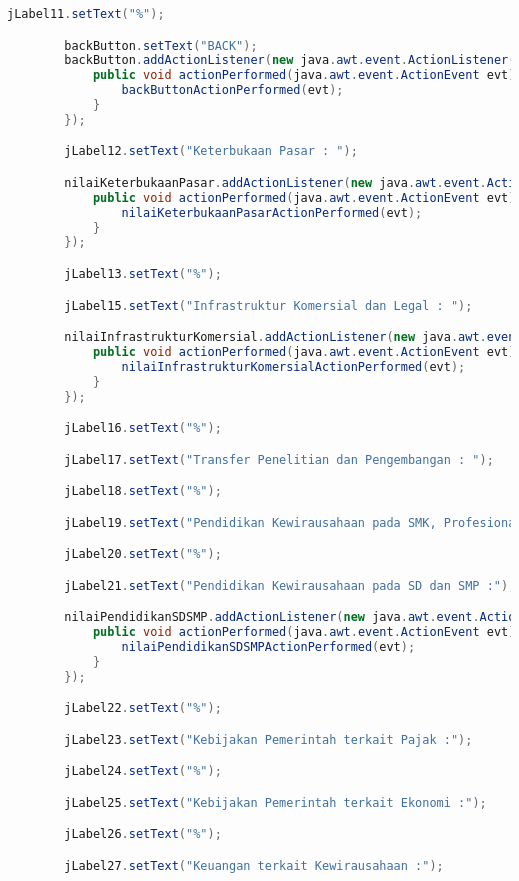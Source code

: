 \begin{lstlisting}[language=Java, caption=TampilanKondisiEksternal.java]
        jLabel11.setText("%");

        backButton.setText("BACK");
        backButton.addActionListener(new java.awt.event.ActionListener() {
            public void actionPerformed(java.awt.event.ActionEvent evt) {
                backButtonActionPerformed(evt);
            }
        });

        jLabel12.setText("Keterbukaan Pasar : ");

        nilaiKeterbukaanPasar.addActionListener(new java.awt.event.ActionListener() {
            public void actionPerformed(java.awt.event.ActionEvent evt) {
                nilaiKeterbukaanPasarActionPerformed(evt);
            }
        });

        jLabel13.setText("%");

        jLabel15.setText("Infrastruktur Komersial dan Legal : ");

        nilaiInfrastrukturKomersial.addActionListener(new java.awt.event.ActionListener() {
            public void actionPerformed(java.awt.event.ActionEvent evt) {
                nilaiInfrastrukturKomersialActionPerformed(evt);
            }
        });

        jLabel16.setText("%");

        jLabel17.setText("Transfer Penelitian dan Pengembangan : ");

        jLabel18.setText("%");

        jLabel19.setText("Pendidikan Kewirausahaan pada SMK, Profesional dan Universitas : ");

        jLabel20.setText("%");

        jLabel21.setText("Pendidikan Kewirausahaan pada SD dan SMP :");

        nilaiPendidikanSDSMP.addActionListener(new java.awt.event.ActionListener() {
            public void actionPerformed(java.awt.event.ActionEvent evt) {
                nilaiPendidikanSDSMPActionPerformed(evt);
            }
        });

        jLabel22.setText("%");

        jLabel23.setText("Kebijakan Pemerintah terkait Pajak :");

        jLabel24.setText("%");

        jLabel25.setText("Kebijakan Pemerintah terkait Ekonomi :");

        jLabel26.setText("%");

        jLabel27.setText("Keuangan terkait Kewirausahaan :");


\end{lstlisting}
